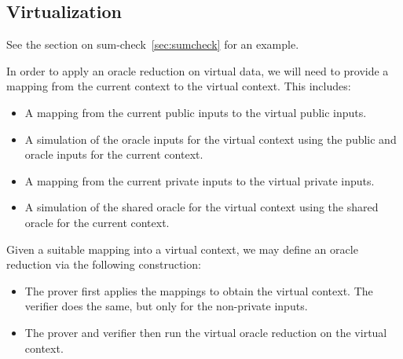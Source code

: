 


\subsection{Virtualization}

See the section on sum-check~\ref{sec:sumcheck} for an example.

\begin{definition}
    \label{def:virtual_context_mapping}
    In order to apply an oracle reduction on virtual data, we will need to provide a mapping from the current context to the virtual context. This includes:
    \begin{itemize}
        \item A mapping from the current public inputs to the virtual public inputs.
        \item A simulation of the oracle inputs for the virtual context using the public and oracle
        inputs for the current context.
        \item A mapping from the current private inputs to the virtual private inputs.
        \item A simulation of the shared oracle for the virtual context using the shared oracle for
        the current context.
    \end{itemize}
\end{definition}

\begin{definition}
    \label{def:virtual_oracle_reduction}
    Given a suitable mapping into a virtual context, we may define an oracle reduction via the following construction:
    \begin{itemize}
        \item The prover first applies the mappings to obtain the virtual context. The verifier does the same, but only for the non-private inputs.
        \item The prover and verifier then run the virtual oracle reduction on the virtual context.
    \end{itemize}
\end{definition}

